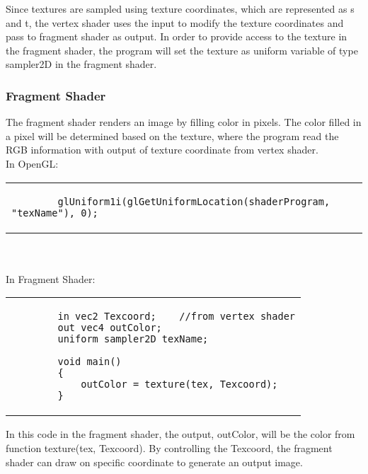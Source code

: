 \documentclass[letterpaper,10pt,serif,draftclsnofoot,onecolumn,compsoc,titlepage]{IEEEtran}
\begin{document}
Since textures are sampled using texture coordinates, which are represented as s and 
t, the vertex shader uses the input to modify the texture coordinates and pass to 
fragment shader as output. In order to provide access to the texture in the fragment 
shader, the program will set the texture as uniform variable of type sampler2D in the 
fragment shader.\\

\subsubsection{Fragment Shader}

The fragment shader renders an image by filling color in pixels. The color filled in a 
pixel will be determined based on the texture, where the program read the RGB 
information with output of texture coordinate from vertex shader.\\

In OpenGL:\\
\begin{tabular}{|p{15cm}|}
	\begin{lstlisting}
		glUniform1i(glGetUniformLocation(shaderProgram, "texName"), 0);
	\end{lstlisting}
\end{tabular}
\\
\\
In Fragment Shader:\\
\begin{tabular}{|p{15cm}|}
	\begin{lstlisting}
   		in vec2 Texcoord;    //from vertex shader
   		out vec4 outColor;
   		uniform sampler2D texName;

   		void main()
   		{
        	outColor = texture(tex, Texcoord);
   		}
	\end{lstlisting}
\end{tabular}

In this code in the fragment shader, the output, outColor, will be the color from 
function texture(tex, Texcoord). By controlling the Texcoord, the fragment shader 
can draw on specific coordinate to generate an output image.\\

\nocite{*}
%
%
\end{document}

